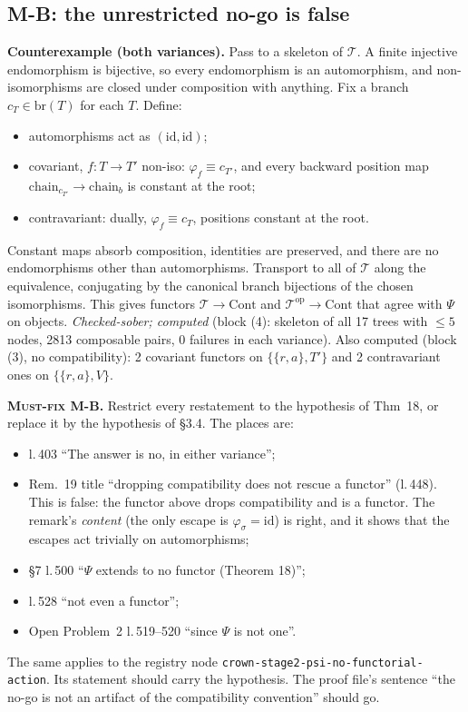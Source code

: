 \documentclass[11pt]{article}
\newcommand{\iss}[1]{\textsc{#1}}
\newcommand{\br}{\mathrm{br}}
\newcommand{\Cont}{\mathrm{Cont}}
\newcommand{\T}{\mathcal T}
\begin{document}
\subsection{M-B: the unrestricted no-go is false}
\textbf{Counterexample (both variances).} Pass to a skeleton of $\T$. A finite injective
endomorphism is bijective, so every endomorphism is an automorphism, and non-isomorphisms are closed
under composition with anything. Fix a branch $c_T\in\br(T)$ for each $T$. Define:
\begin{itemize}[leftmargin=*]
\item automorphisms act as $(\mathrm{id},\mathrm{id})$;
\item covariant, $f\colon T\to T'$ non-iso: $\varphi_f\equiv c_{T'}$, and every backward position map
$\mathrm{chain}_{c_{T'}}\to\mathrm{chain}_b$ is constant at the root;
\item contravariant: dually, $\varphi_f\equiv c_T$, positions constant at the root.
\end{itemize}
Constant maps absorb composition, identities are preserved, and there are no endomorphisms other than
automorphisms. Transport to all of $\T$ along the equivalence, conjugating by the canonical branch
bijections of the chosen isomorphisms. This gives functors $\T\to\Cont$ and $\T^{\mathrm{op}}\to\Cont$
that agree with $\Psi$ on objects. \emph{Checked-sober; computed} (block (4): skeleton of all 17
trees with $\le5$ nodes, 2813 composable pairs, 0 failures in each variance). Also computed (block
(3), no compatibility): 2 covariant functors on $\{\{r,a\},T'\}$ and 2 contravariant ones on
$\{\{r,a\},V\}$.

\textbf{\iss{Must-fix} M-B.} Restrict every restatement to the hypothesis of Thm~18, or replace it
by the hypothesis of \S3.4. The places are:
\begin{itemize}[leftmargin=*]
\item l.\,403 ``The answer is no, in either variance'';
\item Rem.~19 title ``dropping compatibility does not rescue a functor'' (l.\,448). This is false: the
functor above drops compatibility and is a functor. The remark's \emph{content} (the only escape is
$\varphi_\sigma=\mathrm{id}$) is right, and it shows that the escapes act trivially on automorphisms;
\item \S7 l.\,500 ``$\Psi$ extends to no functor (Theorem 18)'';
\item l.\,528 ``not even a functor'';
\item Open Problem~2 l.\,519--520 ``since $\Psi$ is not one''.
\end{itemize}
The same applies to the registry node \texttt{crown-stage2-psi-no-functorial-action}. Its statement
should carry the hypothesis. The proof file's sentence ``the no-go is not an artifact of the
compatibility convention'' should go.
\end{document}
